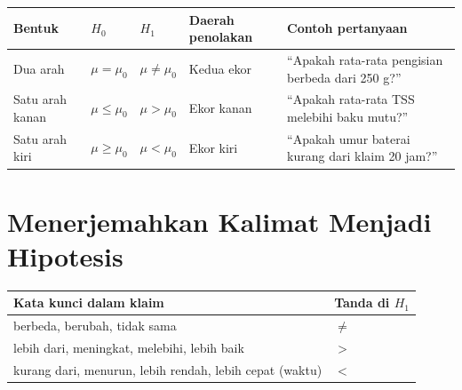 \documentclass[
  indonesian,
  letterpaper,
]{book}
\newcounter{none} %
\begin{document}
{\def\LTcaptype{none} %
\begin{longtable}[]{@{}
  >{\raggedright\arraybackslash}p{}
  >{\raggedright\arraybackslash}p{}
  >{\raggedright\arraybackslash}p{}
  >{\raggedright\arraybackslash}p{}
  >{\raggedright\arraybackslash}p{}@{}}
\toprule\noalign{}
\begin{minipage}[b]{\linewidth}\raggedright
Bentuk
\end{minipage} & \begin{minipage}[b]{\linewidth}\raggedright
\(H_0\)
\end{minipage} & \begin{minipage}[b]{\linewidth}\raggedright
\(H_1\)
\end{minipage} & \begin{minipage}[b]{\linewidth}\raggedright
Daerah penolakan
\end{minipage} & \begin{minipage}[b]{\linewidth}\raggedright
Contoh pertanyaan
\end{minipage} \\
\midrule\noalign{}
\endhead
\bottomrule\noalign{}
\endlastfoot
Dua arah & \(\mu = \mu_0\) & \(\mu \neq \mu_0\) & Kedua ekor & ``Apakah
rata-rata pengisian berbeda dari 250 g?'' \\
Satu arah kanan & \(\mu \leq \mu_0\) & \(\mu > \mu_0\) & Ekor kanan &
``Apakah rata-rata TSS melebihi baku mutu?'' \\
Satu arah kiri & \(\mu \geq \mu_0\) & \(\mu < \mu_0\) & Ekor kiri &
``Apakah umur baterai kurang dari klaim 20 jam?'' \\
\end{longtable}
}

\section{Menerjemahkan Kalimat Menjadi
Hipotesis}\label{menerjemahkan-kalimat-menjadi-hipotesis}

{\def\LTcaptype{none} %
\begin{longtable}[]{@{}ll@{}}
\toprule\noalign{}
Kata kunci dalam klaim & Tanda di \(H_1\) \\
\midrule\noalign{}
\endhead
\bottomrule\noalign{}
\endlastfoot
berbeda, berubah, tidak sama & \(\neq\) \\
lebih dari, meningkat, melebihi, lebih baik & \(>\) \\
kurang dari, menurun, lebih rendah, lebih cepat (waktu) & \(<\) \\
\end{longtable}
}
\end{document}
